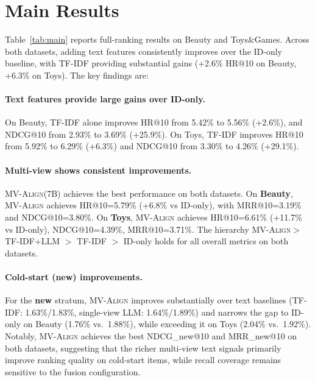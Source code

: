 \documentclass[sigconf,natbib=true,anonymous]{acmart}
\newcommand{\model}{\textsc{MV-Align}\xspace}
\newcommand{\tfidf}{\textsc{TF-IDF}\xspace}
\newcommand{\llm}{\textsc{LLM}\xspace}
\begin{document}
\section{Main Results}\label{sec:main_results}
Table~\ref{tab:main} reports full-ranking results on Beauty
and Toys\&Games. Across both datasets, adding text features
consistently improves over the ID-only baseline, with \tfidf
providing substantial gains (+2.6\% HR@10 on Beauty, +6.3\%
on Toys). The key findings are:

\paragraph{Text features provide large gains over ID-only.}
On Beauty, \tfidf alone improves HR@10 from 5.42\% to 5.56\%
(+2.6\%), and NDCG@10 from 2.93\% to 3.69\% (+25.9\%). On
Toys, \tfidf improves HR@10 from 5.92\% to 6.29\% (+6.3\%)
and NDCG@10 from 3.30\% to 4.26\% (+29.1\%).


\paragraph{Multi-view shows consistent improvements.}
\model (7B) achieves the best performance on both datasets.
On \textbf{Beauty}, \model achieves HR@10=5.79\% (+6.8\% vs
ID-only), with MRR@10=3.19\% and NDCG@10=3.80\%. On
\textbf{Toys}, \model achieves HR@10=6.61\% (+11.7\% vs
ID-only), NDCG@10=4.39\%, MRR@10=3.71\%. The hierarchy
\model $>$ TF-IDF+LLM $>$ TF-IDF $>$ ID-only holds for all
overall metrics on both datasets.

\paragraph{Cold-start (new) improvements.}
For the \textbf{new} stratum, \model improves substantially
over text baselines (\tfidf: 1.63\%/1.83\%, single-view \llm:
1.64\%/1.89\%) and narrows the gap to ID-only on Beauty
(1.76\% vs.\ 1.88\%), while exceeding it on Toys (2.04\%
vs.\ 1.92\%). Notably, \model achieves the best NDCG\_new@10
and MRR\_new@10 on both datasets, suggesting that the richer
multi-view text signals primarily improve ranking quality on
cold-start items, while recall coverage remains sensitive to
the fusion configuration.
\end{document}
